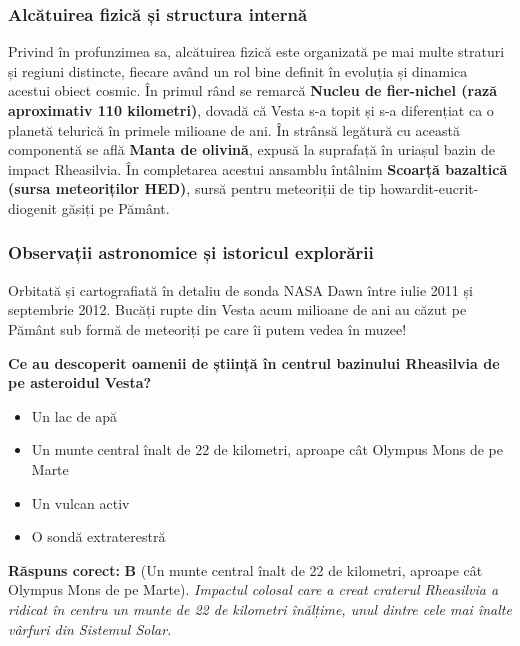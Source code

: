 \subsubsection*{Alcătuirea fizică și structura internă}
Privind în profunzimea sa, alcătuirea fizică este organizată pe mai multe straturi și regiuni distincte, fiecare având un rol bine definit în evoluția și dinamica acestui obiect cosmic. În primul rând se remarcă \textbf{Nucleu de fier-nichel (rază aproximativ 110 kilometri)}, dovadă că Vesta s-a topit și s-a diferențiat ca o planetă telurică în primele milioane de ani. În strânsă legătură cu această componentă se află \textbf{Manta de olivină}, expusă la suprafață în uriașul bazin de impact Rheasilvia. În completarea acestui ansamblu întâlnim \textbf{Scoarță bazaltică (sursa meteoriților HED)}, sursă pentru meteoriții de tip howardit-eucrit-diogenit găsiți pe Pământ.

\subsubsection*{Observații astronomice și istoricul explorării}
Orbitată și cartografiată în detaliu de sonda NASA Dawn între iulie 2011 și septembrie 2012. Bucăți rupte din Vesta acum milioane de ani au căzut pe Pământ sub formă de meteoriți pe care îi putem vedea în muzee!

\vspace{6pt}
\begin{tcolorbox}[orbitarquiz, title={\textbf{Întrebare de verificare \#38: 4 Vesta}}]
\textbf{Ce au descoperit oamenii de știință în centrul bazinului Rheasilvia de pe asteroidul Vesta?}
\begin{itemize}[leftmargin=2.2em, itemsep=2pt, topsep=4pt]
  \item[$\square$ \textbf{A.}] Un lac de apă
  \item[$\square$ \textbf{B.}] Un munte central înalt de 22 de kilometri, aproape cât Olympus Mons de pe Marte
  \item[$\square$ \textbf{C.}] Un vulcan activ
  \item[$\square$ \textbf{D.}] O sondă extraterestră
\end{itemize}
\vspace{2pt}
{\footnotesize\color{orbitarMuted}\textbf{Răspuns corect:} \textbf{B} (Un munte central înalt de 22 de kilometri, aproape cât Olympus Mons de pe Marte). \emph{Impactul colosal care a creat craterul Rheasilvia a ridicat în centru un munte de 22 de kilometri înălțime, unul dintre cele mai înalte vârfuri din Sistemul Solar.}}
\end{tcolorbox}
\clearpage


